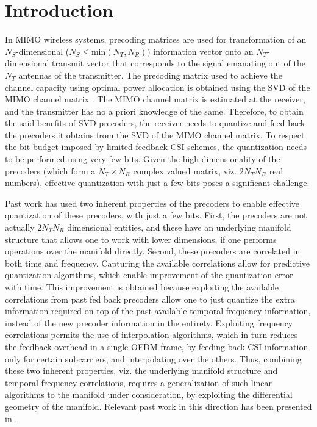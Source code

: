 \documentclass[conference]{IEEEtran}
\begin{document}
\section{Introduction}
\label{intro}
In MIMO wireless systems, precoding matrices are used for transformation of an $N_S$-dimensional ($N_S \leq \text{min}(N_T,N_R))$ information vector onto an $N_T$-dimensional transmit vector that corresponds to the signal emanating out of the $N_T$ antennas of the transmitter.
The precoding matrix used to achieve the channel capacity using optimal power allocation is obtained using the SVD of the MIMO channel matrix \cite{love2008overview}.
The MIMO channel matrix is estimated at the receiver, and the transmitter has no a priori knowledge of the same.
Therefore, to obtain the said benefits of SVD precoders, the receiver needs to quantize and feed back the precoders it obtains from the SVD of the MIMO channel matrix.
To respect the bit budget imposed by limited feedback CSI schemes, the quantization needs to be performed using very few bits.
Given the high dimensionality of the precoders (which form a $N_T \times N_R$ complex valued matrix, viz. $2N_TN_R$ real numbers), effective quantization with just a few bits poses a significant challenge.

Past work has used two inherent properties of the precoders to enable effective quantization of these precoders, with just a few bits.
First, the precoders are not actually $2N_TN_R$ dimensional entities, and these have an underlying manifold structure that allows one to work with lower dimensions, if one performs operations over the manifold directly.
Second, these precoders are correlated in both time and frequency.
Capturing the available correlations allow for predictive quantization algorithms, which enable improvement of the quantization error with time.
This improvement is obtained because exploiting the available correlations from past fed back precoders allow one to just quantize the extra information required on top of the past available temporal-frequency information, instead of the new precoder information in the entirety.
Exploiting frequency correlations permits the use of interpolation algorithms, which in turn reduces the feedback overhead in a single OFDM frame, by feeding back CSI information only for certain subcarriers, and interpolating over the others.
Thus, combining these two inherent properties, viz. the underlying manifold structure and temporal-frequency correlations, requires a generalization of such linear algorithms to the manifold under consideration, by exploiting the differential geometry of the manifold. Relevant past work in this direction has been presented in \cite{Gupt1905:Predictive,6891198,6545375,5671092,Li2016,khaled2005quantized,krishnamachari2013geometry}.
\end{document}
